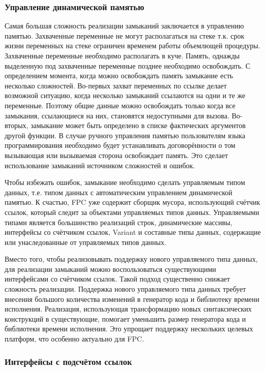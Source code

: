 \documentclass{imcs}
\begin{document}
\subsubsection{Управление динамической памятью}

Самая большая сложность реализации замыканий заключается в управлению памятью. Захваченные переменные
не могут располагаться на стеке т.к. срок жизни переменных на стеке ограничен временем
работы объемлющей процедуры. Захваченные переменные необходимо располагать в куче. Память, однажды
выделенную под захваченные переменные позднее необходимо освобождать. С определением момента,
когда можно освобождать память замыкание есть несколько сложностей. Во-первых 
захват переменных по ссылке делает возможной ситуацию, когда несколько замыканий ссылаются 
на одни и те же переменные. Поэтому общие данные можно освобождать только когда все замыкания,
ссылающиеся на них, становятся недоступными для вызова. Во-вторых, замыкание
может быть определено в списке фактических аргументов другой функции. В случае ручного управления 
памятью пользователям языка программирования необходимо будет устанавливать договорённости
о том вызывающая или вызываемая сторона освобождает память. Это сделает использование замыканий
источником сложностей и ошибок.

Чтобы избежать ошибок, замыкание необходимо сделать управляемым типом данных, т.е.
типом данных с автоматическим управлением динамической памятью. К счастью, FPC уже содержит
сборщик мусора, использующий счётчик ссылок, который следит за объектами управляемых
типов данных. Управляемыми типами является 
большинство реализаций строк, динамические массивы, интерфейсы со счётчиком ссылок, Variant и
составные типы данных, содержащие или унаследованные от управляемых типов данных.

Вместо того, чтобы реализовывать поддержку нового управляемого типа данных, для реализации
замыканий можно воспользоваться существующими интерфейсами со счётчиком ссылок. Такой подход существенно
снижает сложность реализации. Поддержка нового управляемого типа данных требует внесения большого количества
изменений в генератор кода и библиотеку времени исполнения. Реализация, использующая трансформацию
новых синтаксических конструкций в существующие, помогает уменьшить размер генератора кода и библиотеки времени
исполнения. Это упрощает поддержку нескольких целевых платформ, что особенно актуально для FPC.

\subsubsection{Интерфейсы с подсчётом ссылок}
\end{document}
